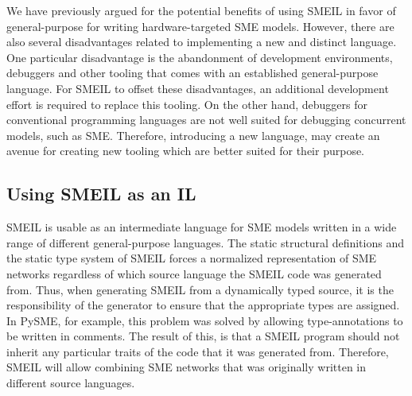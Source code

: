 

We have previously argued for the potential benefits of using SMEIL in favor of
general-purpose for writing hardware-targeted SME models. However, there are
also several disadvantages related to implementing a new and distinct
language. One particular disadvantage is the abandonment of development
environments, debuggers and other tooling that comes with an established
general-purpose language. For SMEIL to offset these disadvantages, an additional
development effort is required to replace this tooling. On the other hand,
debuggers for conventional programming languages are not well suited for
debugging concurrent models, such as SME. Therefore, introducing a new language,
may create an avenue for creating new tooling which are better suited for their
purpose.





\subsection{Using SMEIL as an IL}
SMEIL is usable as an intermediate language for SME models written in a wide
range of different general-purpose languages. The static structural definitions
and the static type system of SMEIL forces a normalized representation of SME
networks regardless of which source language the SMEIL code was generated
from. Thus, when generating SMEIL from a dynamically typed source, it is the
responsibility of the generator to ensure that the appropriate types are
assigned. In PySME, for example, this problem was solved by allowing
type-annotations to be written in comments. The result of this, is that a SMEIL
program should not inherit any particular traits of the code that it was
generated from. Therefore, SMEIL will allow combining SME networks that was
originally written in different source languages.

